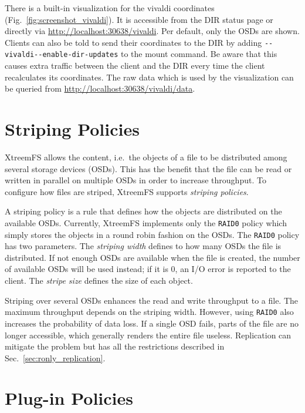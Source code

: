 \documentclass[a4paper,10pt]{book}
\begin{document}
There is a built-in visualization for the vivaldi coordinates (Fig.~\ref{fig:screenshot_vivaldi}).
It is accessible from the DIR status page or directly via \href{http://localhost:30638/vivaldi}{http://localhost:30638/vivaldi}.
Per default, only the OSDs are shown.
Clients can also be told to send their coordinates to the DIR by adding \verb+--vivaldi--enable-dir-updates+ to the mount command.
Be aware that this causes extra traffic between the client and the DIR every time the client recalculates its coordinates.
The raw data which is used by the visualization can be queried from \href{http://localhost:30638/vivaldi/data}{http://localhost:30638/vivaldi/data}.

\section{Striping Policies} \label{sec:striping_policies}

XtreemFS allows the content, i.e.\ the objects of a file to be distributed among several storage devices (OSDs). This has the benefit that the file can be read or written in parallel on multiple OSDs in order to increase throughput. To configure how files are striped, XtreemFS supports \emph{striping policies}.

A striping policy is a rule that defines how the objects are distributed on the available OSDs. Currently, XtreemFS implements only the \texttt{RAID0} policy which simply stores the objects in a round robin fashion on the OSDs. The \texttt{RAID0} policy has two parameters. The \emph{striping width} defines to how many OSDs the file is distributed. If not enough OSDs are available when the file is created, the number of available OSDs will be used instead; if it is 0, an I/O error is reported to the client. The \emph{stripe size} defines the size of each object.

Striping over several OSDs enhances the read and write throughput to a file. The maximum throughput depends on the striping width. However, using \texttt{RAID0} also increases the probability of data loss. If a single OSD fails, parts of the file are no longer accessible, which generally renders the entire file useless. Replication can mitigate the problem but has all the restrictions described in Sec.\ \ref{sec:ronly_replication}.


\section{Plug-in Policies}
\end{document}
